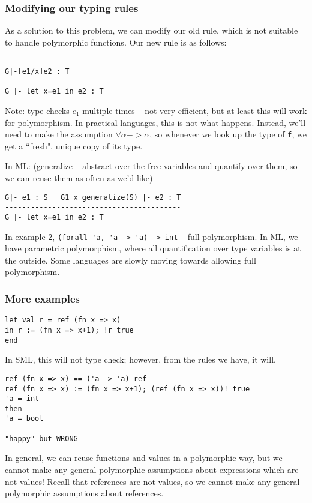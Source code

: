 \documentclass[11pt]{article}
\begin{document}
\subsubsection{Modifying our typing rules}
As a solution to this problem, we can modify our old rule, which is not suitable to handle polymorphic functions. Our new rule is as follows:

\begin{verbatim}

G|-[e1/x]e2 : T
-----------------------
G |- let x=e1 in e2 : T
\end{verbatim}

Note: type checks $e_1$ multiple times -- not very efficient, but at least this will work for polymorphism. In practical languages, this is not what happens. Instead, we'll need to make the assumption $\forall \alpha -> \alpha$, so whenever we look up the type of \verb~f~, we get a ``fresh", unique copy of its type. 

In ML:
(generalize -- abstract over the free variables and quantify over them, so we can reuse them as often as we'd like)
\begin{verbatim}
G|- e1 : S   G1 x generalize(S) |- e2 : T
-----------------------------------------
G |- let x=e1 in e2 : T
\end{verbatim}

In example 2, \verb~(forall 'a, 'a -> 'a) -> int~ -- full polymorphism. In ML, we have parametric polymorphism, where all quantification over type variables is at the outside. Some languages are slowly moving towards allowing full polymorphism.

\subsubsection{More examples}
\begin{verbatim}
let val r = ref (fn x => x)
in r := (fn x => x+1); !r true
end
\end{verbatim}

In SML, this will not type check; however, from the rules we have, it will.
\begin{verbatim}
ref (fn x => x) == ('a -> 'a) ref
ref (fn x => x) := (fn x => x+1); (ref (fn x => x))! true
'a = int
then
'a = bool

"happy" but WRONG
\end{verbatim}
In general, we can reuse functions and values in a polymorphic way, but we cannot make any general polymorphic assumptions about expressions which are not values! Recall that references are not values, so we cannot make any general polymorphic assumptions about references. 
\end{document}
